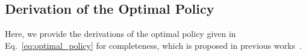 

\subsection{Derivation of the Optimal Policy}
\label{sec:appendix_optimal_soft_policy}
Here, we provide the derivations of the optimal policy given in Eq.~\ref{eq:optimal_policy} for completeness, which is proposed in previous works~\cite{Uehara:2024Finetuning, Uehara:2024Bridging}. 

